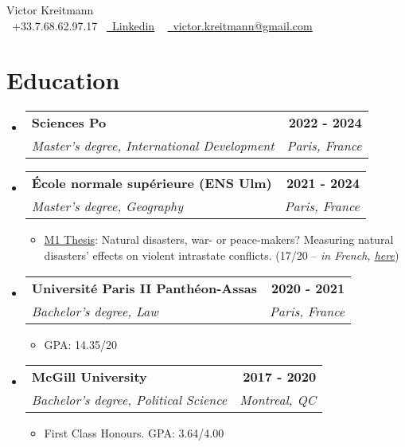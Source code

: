 \documentclass[a4paper,11pt]{article}
\makeatletter
\newcommand{\resumeItem}[1]{
  \item\small{
    {#1 \vspace{-2pt}}
  }
}
\newcommand{\resumeSubheading}[4]{
  \vspace{-2pt}\item
    \begin{tabular*}{1.00\textwidth}[t]{l@{\extracolsep{\fill}}r}
      \textbf{{\small #1}} & {{\textbf{\small #2}}} \\
      \textit{\small#3} & \textit{\small #4} \\
    \end{tabular*}\vspace{-7pt}
}
\newcommand{\resumeSubHeadingListStart}{\begin{itemize}[leftmargin=0.0in, label={}]}
\newcommand{\resumeSubHeadingListEnd}{\end{itemize}}
\newcommand{\resumeItemListStart}{\begin{itemize}}
\newcommand{\resumeItemListEnd}{\end{itemize}\vspace{-5pt}}
\makeatother
\begin{document}

\begin{center}
    {\Huge \upshape Victor Kreitmann} \\ \vspace{1pt}
    \small \raisebox{-0.1\height}\faPhone\ +33.7.68.62.97.17~
    \href{https://www.linkedin.com/in/victor-kreitmann/}{\raisebox{-0.2\height}\faLinkedin\ \underline{Linkedin}}  ~    
    \href{mailto:victor.kreitmann@gmail.com}{\raisebox{-0.2\height}\faEnvelope\  \underline{victor.kreitmann@gmail.com}} ~ 
    \vspace{0pt}
\end{center}




\section{Education}
  \resumeSubHeadingListStart
    \resumeSubheading
      {Sciences Po}{2022 - 2024}
      {Master's degree, International Development}{Paris, France}
      
      \resumeSubheading
      {École normale supérieure (ENS Ulm)}{2021 - 2024}
      {Master's degree, Geography}{Paris, France}
      \resumeItemListStart
      \resumeItem{\underline{M1 Thesis}: Natural disasters, war- or peace-makers? Measuring natural disasters' effects on violent intrastate conflicts. (17/20 – \emph{in French, \href{https://drive.google.com/file/d/1O6ke_2wZjExpSnBBnSKN7shPb0E3ZBgg/view?usp=sharing}{\underline{here}}})}
      \resumeItemListEnd
      
      \resumeSubheading
      {Université Paris II Panthéon-Assas}{2020 - 2021}
      {Bachelor's degree, Law}{Paris, France}
      \resumeItemListStart
      \resumeItem{GPA: 14.35/20}
      \resumeItemListEnd
      
      \resumeSubheading
      {McGill University}{2017 - 2020}
      {Bachelor's degree, Political Science}{Montreal, QC}
      \resumeItemListStart
      \resumeItem{First Class Honours. GPA: 3.64/4.00}
      \resumeItemListEnd
  \resumeSubHeadingListEnd
\vspace{-10pt}
\end{document}
